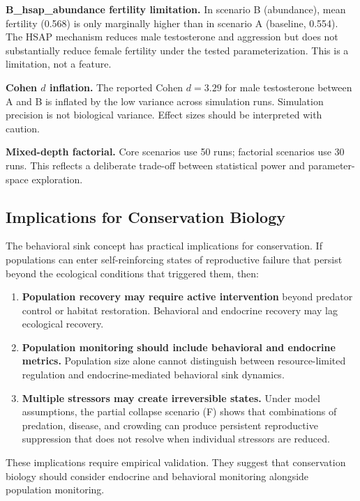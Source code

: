 \textbf{B\_hsap\_abundance fertility limitation.} In scenario B (abundance), mean fertility (0.568) is only marginally higher than in scenario A (baseline, 0.554). The HSAP mechanism reduces male testosterone and aggression but does not substantially reduce female fertility under the tested parameterization. This is a limitation, not a feature.

\textbf{Cohen $d$ inflation.} The reported Cohen $d = 3.29$ for male testosterone between A and B is inflated by the low variance across simulation runs. Simulation precision is not biological variance. Effect sizes should be interpreted with caution.

\textbf{Mixed-depth factorial.} Core scenarios use 50 runs; factorial scenarios use 30 runs. This reflects a deliberate trade-off between statistical power and parameter-space exploration.

\subsection{Implications for Conservation Biology}

The behavioral sink concept has practical implications for conservation. If populations can enter self-reinforcing states of reproductive failure that persist beyond the ecological conditions that triggered them, then:

\begin{enumerate}
\item \textbf{Population recovery may require active intervention} beyond predator control or habitat restoration. Behavioral and endocrine recovery may lag ecological recovery.

\item \textbf{Population monitoring should include behavioral and endocrine metrics.} Population size alone cannot distinguish between resource-limited regulation and endocrine-mediated behavioral sink dynamics.

\item \textbf{Multiple stressors may create irreversible states.} Under model assumptions, the partial collapse scenario (F) shows that combinations of predation, disease, and crowding can produce persistent reproductive suppression that does not resolve when individual stressors are reduced.
\end{enumerate}

These implications require empirical validation. They suggest that conservation biology should consider endocrine and behavioral monitoring alongside population monitoring.

